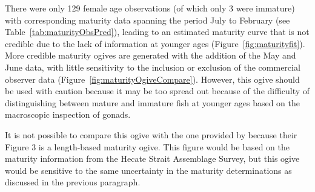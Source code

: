 There were only 129 female age observations (of which only 3 were immature) with corresponding maturity data spanning the period July to February (see Table~\ref{tab:maturityObsPred}), leading to an estimated maturity curve that is not credible due to the lack of information at younger ages (Figure~\ref{fig:maturityfit}). More credible maturity ogives are generated with the addition of the May and June data, with little sensitivity to the inclusion or exclusion of the commercial observer data (Figure~\ref{fig:maturityOgiveCompare}). However, this ogive should be used with caution because it may be too spread out because of the difficulty of distinguishing between mature and immature fish at younger ages based on the macroscopic inspection of gonads.

It is not possible to compare this ogive with the one provided by \citet{arf2001} because their Figure 3 is a length-based maturity ogive. This figure would be based on the maturity information from the Hecate Strait Assemblage Survey, but this ogive would be sensitive to the same uncertainty in the maturity determinations as discussed in the previous paragraph.

